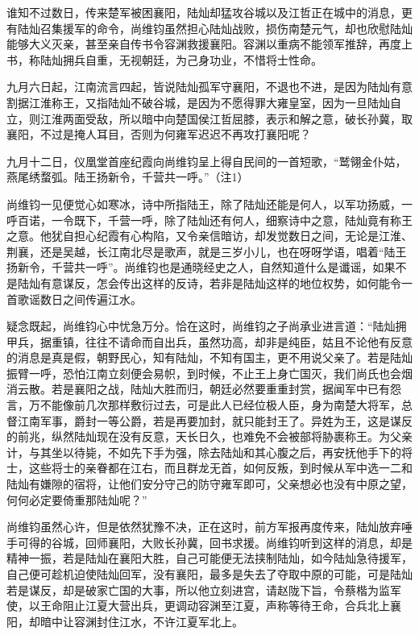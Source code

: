 谁知不过数日，传来楚军被困襄阳，陆灿却猛攻谷城以及江哲正在城中的消息，更有陆灿召集援军的命令，尚维钧虽然担心陆灿战败，损伤南楚元气，却也欣慰陆灿能够大义灭亲，甚至亲自传书令容渊救援襄阳。容渊以重病不能领军推辞，再度上书，称陆灿拥兵自重，无视朝廷，为己身功业，不惜将士性命。

九月六日起，江南流言四起，皆说陆灿孤军守襄阳，不退也不进，是因为陆灿有意割据江淮称王，又指陆灿不破谷城，是因为不愿得罪大雍皇室，因为一旦陆灿自立，则江淮两面受敌，所以暗中向楚国侯江哲屈膝，表示和解之意，破长孙冀，取襄阳，不过是掩人耳目，否则为何雍军迟迟不再攻打襄阳呢？

九月十二日，仪凰堂首座纪霞向尚维钧呈上得自民间的一首短歌，“鹫翎金仆姑，燕尾绣蝥弧。陆王扬新令，千营共一呼。”（注1）

尚维钧一见便觉心如寒冰，诗中所指陆王，除了陆灿还能是何人，以军功扬威，一呼百诺，一令既下，千营一呼，除了陆灿还有何人，细察诗中之意，陆灿竟有称王之意。他犹自担心纪霞有心构陷，又令亲信暗访，却发觉数日之间，无论是江淮、荆襄，还是吴越，长江南北尽是歌声，就是三岁小儿，也在呀呀学语，唱着“陆王扬新令，千营共一呼”。尚维钧也是通晓经史之人，自然知道什么是谶谣，如果不是陆灿有意谋反，怎会传出这样的反诗，若非是陆灿这样的地位权势，如何能令一首歌谣数日之间传遍江水。

疑念既起，尚维钧心中忧急万分。恰在这时，尚维钧之子尚承业进言道：“陆灿拥甲兵，据重镇，往往不请命而自出兵，虽然功高，却非是纯臣，姑且不论他有反意的消息是真是假，朝野民心，知有陆灿，不知有国主，更不用说父亲了。若是陆灿振臂一呼，恐怕江南立刻便会易帜，到时候，不止王上身亡国灭，我们尚氏也会烟消云散。若是襄阳之战，陆灿大胜而归，朝廷必然要重重封赏，据闻军中已有怨言，万不能像前几次那样敷衍过去，可是此人已经位极人臣，身为南楚大将军，总督江南军事，爵封一等公爵，若是再要加封，就只能封王了。异姓为王，这是谋反的前兆，纵然陆灿现在没有反意，天长日久，也难免不会被部将胁裹称王。为父亲计，与其坐以待毙，不如先下手为强，除去陆灿和其心腹之后，再安抚他手下的将士，这些将士的亲眷都在江右，而且群龙无首，如何反叛，到时候从军中选一二和陆灿有嫌隙的宿将，让他们安分守己的防守雍军即可，父亲想必也没有中原之望，何何必定要倚重那陆灿呢？”

尚维钧虽然心许，但是依然犹豫不决，正在这时，前方军报再度传来，陆灿放弃唾手可得的谷城，回师襄阳，大败长孙冀，回书求援。尚维钧听到这样的消息，却是精神一振，若是陆灿在襄阳大胜，自己可能便无法挟制陆灿，如今陆灿急待援军，自己便可趁机迫使陆灿回军，没有襄阳，最多是失去了夺取中原的可能，可是陆灿若是谋反，却是破家亡国的大事，所以他立刻进宫，请赵陇下旨，令蔡楷为监军使，以王命阻止江夏大营出兵，更调动容渊至江夏，声称等待王命，合兵北上襄阳，却暗中让容渊封住江水，不许江夏军北上。

